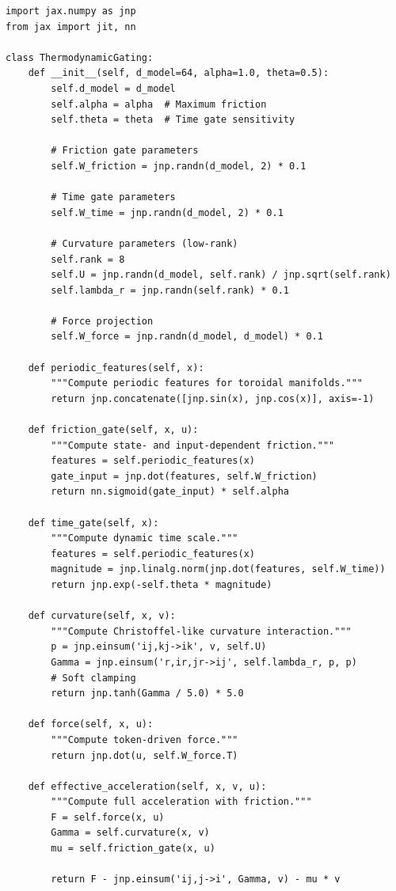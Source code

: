 \documentclass[12pt,letterpaper,twoside]{article}
\begin{document}
\begin{verbatim}
import jax.numpy as jnp
from jax import jit, nn

class ThermodynamicGating:
    def __init__(self, d_model=64, alpha=1.0, theta=0.5):
        self.d_model = d_model
        self.alpha = alpha  # Maximum friction
        self.theta = theta  # Time gate sensitivity
        
        # Friction gate parameters
        self.W_friction = jnp.randn(d_model, 2) * 0.1
        
        # Time gate parameters
        self.W_time = jnp.randn(d_model, 2) * 0.1
        
        # Curvature parameters (low-rank)
        self.rank = 8
        self.U = jnp.randn(d_model, self.rank) / jnp.sqrt(self.rank)
        self.lambda_r = jnp.randn(self.rank) * 0.1
        
        # Force projection
        self.W_force = jnp.randn(d_model, d_model) * 0.1
        
    def periodic_features(self, x):
        """Compute periodic features for toroidal manifolds."""
        return jnp.concatenate([jnp.sin(x), jnp.cos(x)], axis=-1)
    
    def friction_gate(self, x, u):
        """Compute state- and input-dependent friction."""
        features = self.periodic_features(x)
        gate_input = jnp.dot(features, self.W_friction)
        return nn.sigmoid(gate_input) * self.alpha
    
    def time_gate(self, x):
        """Compute dynamic time scale."""
        features = self.periodic_features(x)
        magnitude = jnp.linalg.norm(jnp.dot(features, self.W_time))
        return jnp.exp(-self.theta * magnitude)
    
    def curvature(self, x, v):
        """Compute Christoffel-like curvature interaction."""
        p = jnp.einsum('ij,kj->ik', v, self.U)
        Gamma = jnp.einsum('r,ir,jr->ij', self.lambda_r, p, p)
        # Soft clamping
        return jnp.tanh(Gamma / 5.0) * 5.0
    
    def force(self, x, u):
        """Compute token-driven force."""
        return jnp.dot(u, self.W_force.T)
    
    def effective_acceleration(self, x, v, u):
        """Compute full acceleration with friction."""
        F = self.force(x, u)
        Gamma = self.curvature(x, v)
        mu = self.friction_gate(x, u)
        
        return F - jnp.einsum('ij,j->i', Gamma, v) - mu * v
    

\end{verbatim}
\end{document}
